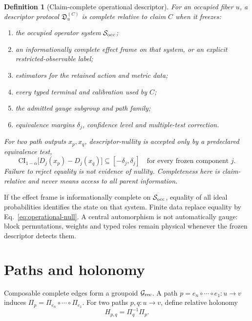 \documentclass[11pt]{article}
\newtheorem{definition}{Definition}
\begin{document}
\begin{definition}[Claim-complete operational descriptor]
For an occupied fiber \(u\), a descriptor protocol
\(\mathfrak D_u^{(C)}\) is complete relative to claim \(C\) when it freezes:
\begin{enumerate}[label=(D\arabic*)]
 \item the occupied operator system \(\mathcal S_{\rm occ}\);
 \item an informationally complete effect frame on that system, or an explicit
 restricted-observable label;
 \item estimators for the retained action and metric data;
 \item every typed terminal and calibration used by \(C\);
 \item the admitted gauge subgroup and path family;
 \item equivalence margins \(\delta_j\), confidence level and multiple-test
 correction.
\end{enumerate}
For two path outputs \(x_p,x_q\), descriptor-nullity is accepted only by a
predeclared equivalence test,
\begin{equation}
 \mathrm{CI}_{1-\alpha}\bigl[D_j(x_p)-D_j(x_q)\bigr]
 \subseteq[-\delta_j,\delta_j]
 \quad\text{for every frozen component }j.
 \label{eq:operational-null}
\end{equation}
Failure to reject equality is not evidence of nullity.  Completeness here is
claim-relative and never means access to all parent information.
\end{definition}

If the effect frame is informationally complete on
\(\mathcal S_{\rm occ}\), equality of all ideal probabilities identifies the
state on that system.  Finite data replace equality by
Eq.~\eqref{eq:operational-null}.  A central automorphism is not automatically
gauge: block permutations, weights and typed roles remain physical whenever
the frozen descriptor detects them.

\section{Paths and holonomy}

Composable complete edges form a groupoid \(\mathcal G_{\rm rec}\).  A path
\(p=e_n\circ\cdots\circ e_1:u\to v\) induces
\(\Pi_p=\Pi_{e_n}\circ\cdots\circ\Pi_{e_1}\).  For two paths \(p,q:u\to v\),
define relative holonomy
\begin{equation}
 H_{p,q}=\Pi_q^{-1}\Pi_p.
 \label{eq:relative-holonomy}
\end{equation}
\end{document}
